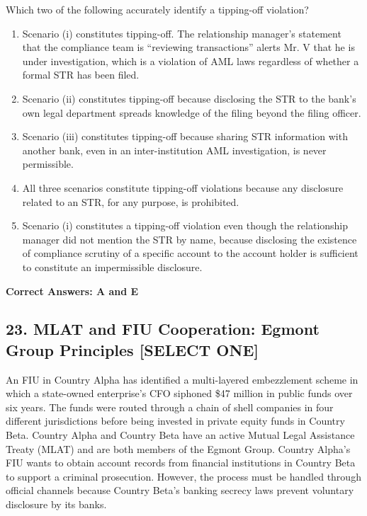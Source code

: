 \documentclass[11pt,a4paper]{article}
\begin{document}
	Which two of the following accurately identify a tipping-off violation?
	
	\begin{enumerate}[label=\Alph*.]
		\item Scenario (i) constitutes tipping-off. The relationship manager's statement that the compliance team is ``reviewing transactions'' alerts Mr. V that he is under investigation, which is a violation of AML laws regardless of whether a formal STR has been filed.
		\item Scenario (ii) constitutes tipping-off because disclosing the STR to the bank's own legal department spreads knowledge of the filing beyond the filing officer.
		\item Scenario (iii) constitutes tipping-off because sharing STR information with another bank, even in an inter-institution AML investigation, is never permissible.
		\item All three scenarios constitute tipping-off violations because any disclosure related to an STR, for any purpose, is prohibited.
		\item Scenario (i) constitutes a tipping-off violation even though the relationship manager did not mention the STR by name, because disclosing the existence of compliance scrutiny of a specific account to the account holder is sufficient to constitute an impermissible disclosure.
	\end{enumerate}
	\textbf{Correct Answers: A and E}
	
	\subsection{23. MLAT and FIU Cooperation: Egmont Group Principles \textnormal{[SELECT ONE]}}
	
	An FIU in Country Alpha has identified a multi-layered embezzlement scheme in which a state-owned enterprise's CFO siphoned \$47 million in public funds over six years. The funds were routed through a chain of shell companies in four different jurisdictions before being invested in private equity funds in Country Beta. Country Alpha and Country Beta have an active Mutual Legal Assistance Treaty (MLAT) and are both members of the Egmont Group. Country Alpha's FIU wants to obtain account records from financial institutions in Country Beta to support a criminal prosecution. However, the process must be handled through official channels because Country Beta's banking secrecy laws prevent voluntary disclosure by its banks.
	
\end{document}
